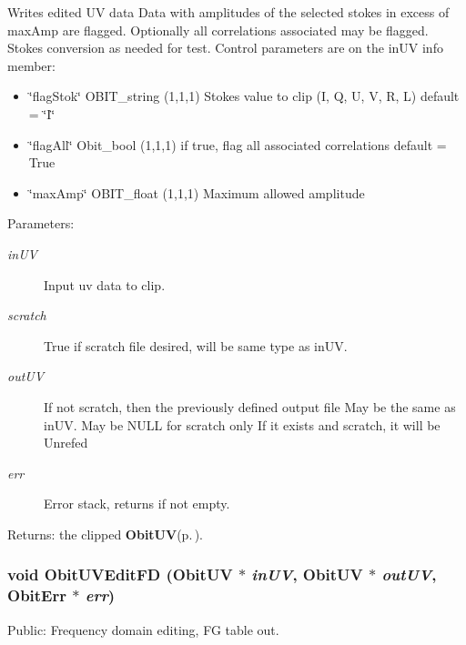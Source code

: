 Writes edited UV data Data with amplitudes of the selected stokes in excess of max\-Amp are flagged. Optionally all correlations associated may be flagged. Stokes conversion as needed for test. Control parameters are on the in\-UV info member: \begin{itemize}
\item \char`\"{}flag\-Stok\char`\"{} OBIT\_\-string (1,1,1) Stokes value to clip (I, Q, U, V, R, L) default = \char`\"{}I\char`\"{} \item \char`\"{}flag\-All\char`\"{} Obit\_\-bool (1,1,1) if true, flag all associated correlations default = True \item \char`\"{}max\-Amp\char`\"{} OBIT\_\-float (1,1,1) Maximum allowed amplitude\end{itemize}
\begin{Desc}
\item[Parameters:]
\begin{description}
\item[{\em in\-UV}]Input uv data to clip. \item[{\em scratch}]True if scratch file desired, will be same type as in\-UV. \item[{\em out\-UV}]If not scratch, then the previously defined output file May be the same as in\-UV. May be NULL for scratch only If it exists and scratch, it will be Unrefed \item[{\em err}]Error stack, returns if not empty. \end{description}
\end{Desc}
\begin{Desc}
\item[Returns:]the clipped {\bf Obit\-UV}{\rm (p.\,\pageref{structObitUV})}. \end{Desc}
\subsubsection{\setlength{\rightskip}{0pt plus 5cm}void Obit\-UVEdit\-FD ({\bf Obit\-UV} $\ast$ {\em in\-UV}, {\bf Obit\-UV} $\ast$ {\em out\-UV}, {\bf Obit\-Err} $\ast$ {\em err})}\label{ObitUVEdit_8h_a2}


Public: Frequency domain editing, FG table out. 


